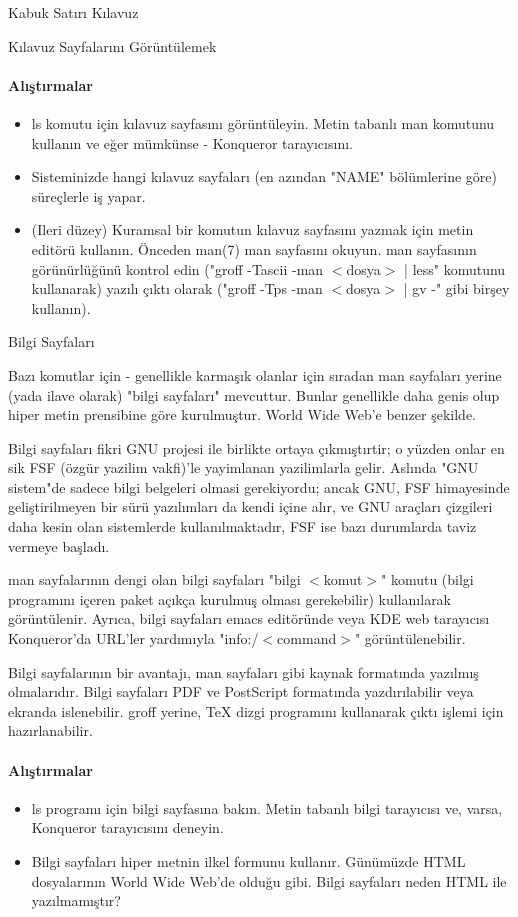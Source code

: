 \begin{section}{Kabuk Satırı Kılavuz}
\begin{subsection}{Kılavuz Sayfalarını Görüntülemek }
\paragraph{Alıştırmalar}{
\begin{itemize}
 \item ls komutu için kılavuz sayfasını görüntüleyin. Metin tabanlı man komutunu kullanın ve eğer mümkünse - Konqueror tarayıcısını.
 \item Sisteminizde hangi kılavuz sayfaları (en azından "NAME" bölümlerine göre) süreçlerle iş yapar.
 \item (Ileri düzey) Kuramsal bir komutun kılavuz sayfasını yazmak için metin editörü kullanın. Önceden man(7) man sayfasını okuyun. man sayfasının görünürlüğünü kontrol edin ("groff -Tascii -man $<$dosya$>$ | less" komutunu kullanarak) yazılı çıktı olarak ("groff -Tps -man $<$dosya$>$ | gv -" gibi birşey kullanın).
\end{itemize}}
\end{subsection}
\end{section}
\begin{section}{Bilgi Sayfaları}

Bazı komutlar için - genellikle karmaşık olanlar için sıradan man sayfaları yerine (yada ilave olarak) "bilgi sayfaları" mevcuttur.
Bunlar genellikle daha genis olup hiper metin prensibine göre kurulmuştur. World Wide Web'e benzer şekilde.

Bilgi sayfaları fikri GNU projesi ile birlikte ortaya çıkmıştırtir; o yüzden onlar en sik FSF (özgür yazilim vakfi)'le yayimlanan yazilimlarla gelir. Aslında "GNU sistem"de sadece bilgi belgeleri olmasi gerekiyordu; ancak GNU, FSF himayesinde geliştirilmeyen bir sürü yazılımları da kendi içine alır, ve GNU araçları çizgileri daha kesin olan sistemlerde kullanılmaktadır, FSF ise bazı durumlarda taviz vermeye başladı.

man sayfalarının dengi olan bilgi sayfaları "bilgi $<$komut$>$" komutu (bilgi programını içeren paket açıkça kurulmuş olması gerekebilir) kullanılarak görüntülenir. Ayrıca, bilgi sayfaları emacs editöründe veya KDE web tarayıcısı Konqueror'da URL'ler yardımıyla "info:/$<$command$>$" görüntülenebilir.

Bilgi sayfalarının bir avantajı, man sayfaları gibi kaynak formatında yazılmış olmalarıdır. Bilgi sayfaları PDF ve PostScript formatında yazdırılabilir veya ekranda islenebilir. groff yerine, \TeX{} dizgi programını kullanarak çıktı işlemi için hazırlanabilir.

\paragraph{Alıştırmalar}{
\begin{itemize}
 \item ls programı için bilgi sayfasına bakın. Metin tabanlı bilgi tarayıcısı ve, varsa, Konqueror tarayıcısını deneyin.
 \item Bilgi sayfaları hiper metnin ilkel formunu kullanır. Günümüzde HTML dosyalarının World Wide Web'de olduğu gibi. Bilgi sayfaları neden HTML ile yazılmamıştır?
\end{itemize}}
\end{section}
